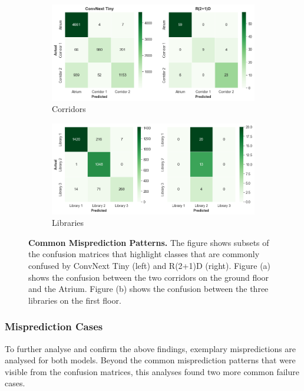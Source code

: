 \documentclass[a4paper]{article}
\begin{document}
\begin{figure}
  \centering
  \begin{subfigure}[b]{\textwidth}
    \includegraphics[width=\textwidth]{./figures/conf-matrix-corridors.png}
    \caption{Corridors}
  \end{subfigure}
  \vspace{.5cm}
  \begin{subfigure}[b]{\textwidth}
    \includegraphics[width=\textwidth]{./figures/conf-matrix-libraries.png}
    \caption{Libraries}
  \end{subfigure}
  \caption{
    \textbf{Common Misprediction Patterns.} The figure shows subsets of the
    confusion matrices that highlight classes that are commonly confused by
    ConvNext Tiny (left) and R(2+1)D (right). Figure (a) shows the confusion
    between the two corridors on the ground floor and the Atrium. Figure (b)
    shows the confusion between the three libraries on the first floor. 
  }
  \label{fig:conf-matrix-challenging}
\end{figure}

\subsubsection{Misprediction Cases} %
\label{sub:mispredictons}

To further analyse and confirm the above findings, exemplary mispredictions are
analysed for both models. Beyond the common misprediction patterns that were
visible from the confusion matrices, this analyses found two more common failure
cases.
\end{document}
